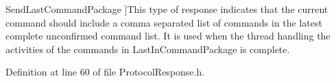 \begin{Desc}
\begin{description}
{\hypertarget{namespace_picto_1_1_registered_response_type_abc60624d7d7b5a5d029fdaf2404311d2a05e7bf540c641f55b7cb237ad5f46161}{Send\-Last\-Command\-Package}\label{namespace_picto_1_1_registered_response_type_abc60624d7d7b5a5d029fdaf2404311d2a05e7bf540c641f55b7cb237ad5f46161}
}]This type of response indicates that the current command should include a comma separated list of commands in the latest complete unconfirmed command list. It is used when the thread handling the activities of the commands in Last\-In\-Command\-Package is complete. \end{description}
\end{Desc}


Definition at line 60 of file Protocol\-Response.\-h.

